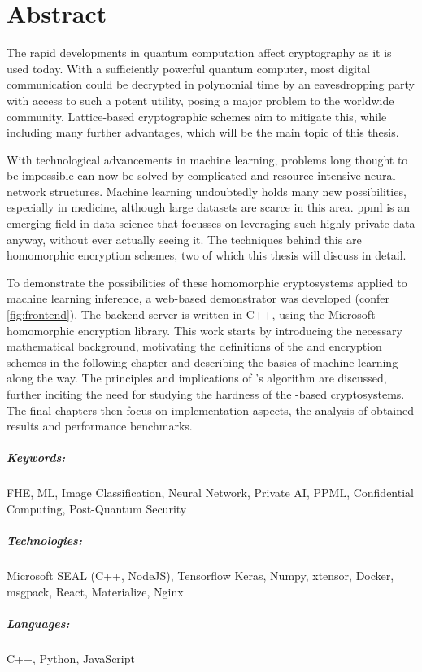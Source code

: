 \chapter*{Abstract}
The rapid developments in quantum computation affect cryptography as it is used today.
With a sufficiently powerful quantum computer, most digital communication could be decrypted in polynomial time by an eavesdropping party with access to such a potent utility, posing a major problem to the worldwide community.
Lattice-based cryptographic schemes aim to mitigate this, while including many further advantages, which will be the main topic of this thesis.

With technological advancements in machine learning, problems long thought to be impossible can now be solved by complicated and resource-intensive neural network structures.
Machine learning undoubtedly holds many new possibilities, especially in medicine, although large datasets are scarce in this area.
\Gls{ppml} is an emerging field in data science that focusses on leveraging such highly private data anyway, without ever actually seeing it.
The techniques behind this are homomorphic encryption schemes, two of which this thesis will discuss in detail.

To demonstrate the possibilities of these homomorphic cryptosystems applied to machine learning inference, a web-based demonstrator was developed (confer \cref{fig:frontend}).
The backend server is written in C++, using the Microsoft  homomorphic encryption library.
This work starts by introducing the necessary mathematical background, motivating the definitions of the  and  encryption schemes in the following chapter and describing the basics of machine learning along the way.
The principles and implications of 's algorithm are discussed, further inciting the need for studying the hardness of the -based cryptosystems.
The final chapters then focus on implementation aspects, the analysis of obtained results and performance benchmarks.

\paragraph{Keywords:}
FHE, ML, Image Classification, Neural Network,
Private AI, PPML, Confidential Computing,
Post-Quantum Security

\paragraph{Technologies:}
Microsoft SEAL (C++, NodeJS),
Tensorflow Keras,
Numpy,
xtensor,
Docker,
msgpack,
React,
Materialize,
Nginx

\paragraph{Languages:}
C++, Python, JavaScript
